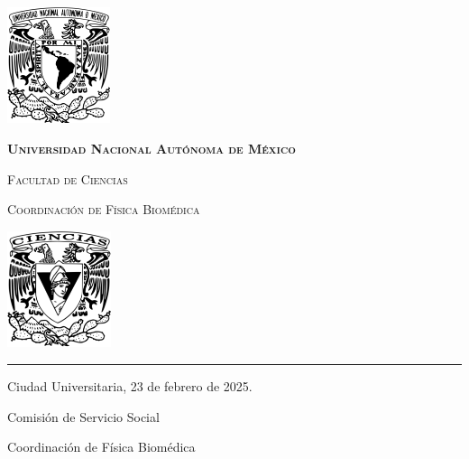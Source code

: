 \documentclass[9pt,letterpaper]{article}
\begin{document}
	
	
	\begin{center}
		\begin{minipage}{3cm}
			\begin{center}
				\includegraphics[height=3.4cm]{../Figuras/Logo_UNAM (1)}
			\end{center}
		\end{minipage}\hfill
		\begin{minipage}{10cm}
			\begin{center}
				{\scshape\LARGE \textbf{Universidad Nacional Autónoma de México} \par}
				{\scshape\Large Facultad de Ciencias\par}
				{\scshape\Large Coordinación de Física Biomédica\par}
			\end{center}
		\end{minipage}\hfill
		\begin{minipage}{3cm}
			\begin{center}
				\includegraphics[height=3.4cm]{../Figuras/Logo_FC (1)}
			\end{center}
		\end{minipage}
	\end{center}
	
	\rule{17cm}{0.1mm}
	
	\hspace{0.5cm}
	
	\parbox{\textwidth}{\raggedleft Ciudad Universitaria, 23 de febrero de 2025.}
	
		\hspace{0.5cm}
	
	Comisión de Servicio Social
	
	Coordinación de Física Biomédica
	
\end{document}
